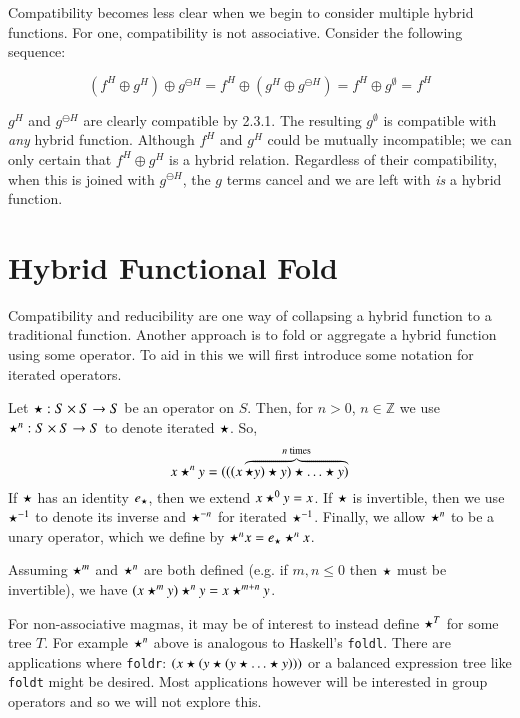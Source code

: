 Compatibility becomes less clear when we begin to consider multiple hybrid functions.
For one, compatibility is not associative.
Consider the following sequence:


\begin{equation}
(f^H \oplus g^H) \oplus g^{\ominus H} = f^H \oplus (g^H \oplus g^{\ominus H}) = f^H \oplus g^\emptyset = f^H
\end{equation}

$g^H$ and $g^{\ominus H}$ are clearly compatible by 2.3.1.
The resulting $g^{\emptyset}$ is compatible with \emph{any} hybrid function.
Although $f^H$ and $g^H$ could be mutually incompatible; 
we can only certain that $f^H \oplus g^H$ is a hybrid relation.
Regardless of their compatibility, when this is joined with $g^{\ominus H}$, the $g$ terms cancel
and we are left with \emph{is} a hybrid function.





\section{Hybrid Functional Fold}


Compatibility and reducibility are one way of collapsing a hybrid function to a traditional function.
Another approach is to fold or aggregate a hybrid function using some operator.
To aid in this we will first introduce some notation for iterated operators.
\begin{definition}
	Let $\star : S \times S \to S$ be an operator on $S$.
	Then, for $n > 0$, $n \in \mathbb{Z}$ we use $\star^n:S \times S \to S$ to denote iterated $\star$.
	So,
	\begin{equation}
		x \star^n y = (((x \overbrace{\star y) \star y) \star \ldots \star y)}^{n \text{ times}}
	\end{equation}
	If $\star$ has an identity $e_\star$, then we extend $x \star^0 y = x$.
	If $\star$ is invertible, then we use $\star^{-1}$ to denote its inverse and $\star^{-n}$ for iterated $\star^{-1}$.
	Finally, we allow $\star^n$ to be a unary operator, which we define by $\star^n x = e_\star \star^n x$.
\end{definition}

Assuming $\star^m$ and $\star^n$ are both defined (e.g. if $m,n \leq 0$ then $\star$ must be invertible),
we have $ ( x \star^m y ) \star^n y = x \star^{m+n} y$.

For non-associative magmas, it may be of interest to instead define $\star^T$ for some tree $T$. 
For example $\star^n$ above is analogous to Haskell's \texttt{foldl}.
There are applications where \texttt{foldr}: $(x \star ( y \star ( y \star \ldots \star y)))$ or a balanced expression tree like \texttt{foldt} might be desired.
Most applications however will be interested in group operators and so we will not explore this.

